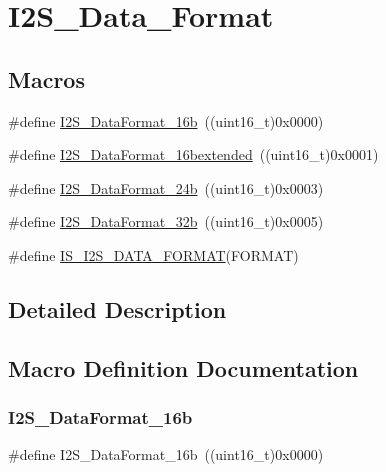 \hypertarget{group___i2_s___data___format}{}\section{I2\+S\+\_\+\+Data\+\_\+\+Format}
\label{group___i2_s___data___format}
\subsection*{Macros}
\begin{DoxyCompactItemize}
\item 
\#define \mbox{\hyperlink{group___i2_s___data___format_gabcd7cb799b68346a735709cc135bd414}{I2\+S\+\_\+\+Data\+Format\+\_\+16b}}~((uint16\+\_\+t)0x0000)
\item 
\#define \mbox{\hyperlink{group___i2_s___data___format_gae44b9704c9e393d5abec9bf4fcfe1116}{I2\+S\+\_\+\+Data\+Format\+\_\+16bextended}}~((uint16\+\_\+t)0x0001)
\item 
\#define \mbox{\hyperlink{group___i2_s___data___format_ga5a959486671cf00c5a734f1df205581b}{I2\+S\+\_\+\+Data\+Format\+\_\+24b}}~((uint16\+\_\+t)0x0003)
\item 
\#define \mbox{\hyperlink{group___i2_s___data___format_ga6be3bdcc713cb92a9ad247de013a5e37}{I2\+S\+\_\+\+Data\+Format\+\_\+32b}}~((uint16\+\_\+t)0x0005)
\item 
\#define \mbox{\hyperlink{group___i2_s___data___format_gac467da829eca4a5c4ce41a6abd2d8e81}{I\+S\+\_\+\+I2\+S\+\_\+\+D\+A\+T\+A\+\_\+\+F\+O\+R\+M\+AT}}(F\+O\+R\+M\+AT)
\end{DoxyCompactItemize}


\subsection{Detailed Description}


\subsection{Macro Definition Documentation}
\mbox{\label{group___i2_s___data___format_gabcd7cb799b68346a735709cc135bd414}} 
\subsubsection{\texorpdfstring{I2S\_DataFormat\_16b}{I2S\_DataFormat\_16b}}
{\footnotesize\ttfamily \#define I2\+S\+\_\+\+Data\+Format\+\_\+16b~((uint16\+\_\+t)0x0000)}

